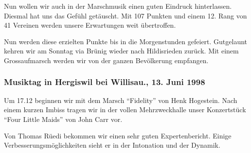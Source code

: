 \begin{history}
    Nun wollen wir auch in der Marschmusik einen guten Eindruck hinterlassen.
    Diesmal hat uns das Gefühl getäuscht. Mit 107 Punkten und einem 12. Rang von
    41 Vereinen werden unsere Erwartungen weit übertroffen.

    Nun werden diese erzielten Punkte bis in die Morgenstunden gefeiert.
    Gutgelaunt kehren wir am Sonntag via Brünig wieder nach Hildisrieden zurück.
    Mit einem Grossaufmarsch werden wir von der ganzen Bevölkerung empfangen.


    \subsubsection*{Musiktag in Hergiswil bei Willisau., 13. Juni 1998}

    Um 17.12 beginnen wir mit dem Marsch \enquote{Fidelity} von Henk Hogestein.
    Nach einem kurzen Imbiss tragen wir in der vollen Mehrzweckhalle unser
    Konzertstück \enquote{Four Little Maids} von John Carr vor.

    Von Thomas Rüedi bekommen wir einen sehr guten Expertenbericht. Einige
    Verbesserungsmöglichkeiten sieht er in der Intonation und der Dynamik.

\end{history}